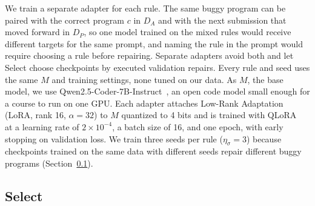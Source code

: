 \documentclass[conference]{IEEEtran}
\begin{document}
We train a separate adapter for each rule. The same buggy program can be paired with the correct program \(c\) in \(D_A\) and with the next submission that moved forward in \(D_P\), so one model trained on the mixed rules would receive different targets for the same prompt, and naming the rule in the prompt would require choosing a rule before repairing. Separate adapters avoid both and let Select choose checkpoints by executed validation repairs. Every rule and seed uses the same \(M\) and training settings, none tuned on our data. As \(M\), the base model, we use Qwen2.5-Coder-7B-Instruct~\cite{hui2024qwen2}, an open code model small enough for a course to run on one GPU. Each adapter attaches Low-Rank Adaptation (LoRA, rank 16, \(\alpha=32\)) to \(M\) quantized to 4 bits and is trained with QLoRA~\cite{dettmers2023qlora} at a learning rate of \(2\times10^{-4}\), a batch size of 16, and one epoch, with early stopping on validation loss. We train three seeds per rule (\(\eta_\sigma=3\)) because checkpoints trained on the same data with different seeds repair different buggy programs (Section~\ref{sec:select}).

\subsection{Select}
\label{sec:select}
\end{document}
